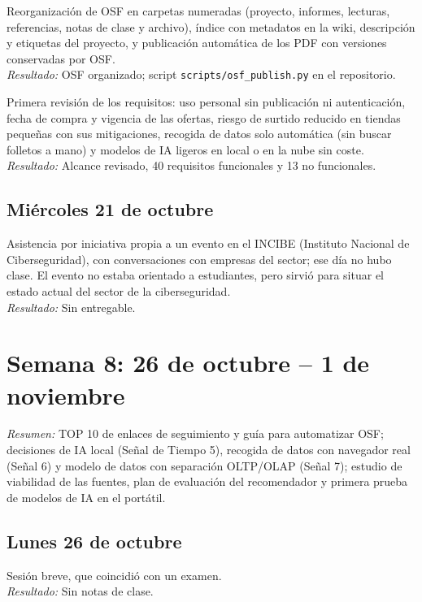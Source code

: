 \documentclass[11pt,a4paper]{article}
\newcommand{\actividad}[3]{\item[\textbf{[#1]}] #2 \\ \textit{Resultado:} #3}
\begin{document}
\begin{description}[leftmargin=0pt, itemsep=6pt]
		\actividad{Tarea}{Reorganización de OSF en carpetas numeradas (proyecto, informes, lecturas, referencias, notas de clase y archivo), índice con metadatos en la wiki, descripción y etiquetas del proyecto, y publicación automática de los PDF con versiones conservadas por OSF.}{OSF organizado; script \texttt{scripts/osf\_publish.py} en el repositorio.}
		\actividad{Análisis}{Primera revisión de los requisitos: uso personal sin publicación ni autenticación, fecha de compra y vigencia de las ofertas, riesgo de surtido reducido en tiendas pequeñas con sus mitigaciones, recogida de datos solo automática (sin buscar folletos a mano) y modelos de IA ligeros en local o en la nube sin coste.}{Alcance revisado, 40 requisitos funcionales y 13 no funcionales.}
	\end{description}

	\subsection*{Miércoles 21 de octubre}
	\begin{description}[leftmargin=0pt, itemsep=6pt]
		\actividad{Visita}{Asistencia por iniciativa propia a un evento en el INCIBE (Instituto Nacional de Ciberseguridad), con conversaciones con empresas del sector; ese día no hubo clase. El evento no estaba orientado a estudiantes, pero sirvió para situar el estado actual del sector de la ciberseguridad.}{Sin entregable.}
	\end{description}

	\section*{Semana 8: 26 de octubre -- 1 de noviembre}
	\textit{Resumen:} TOP 10 de enlaces de seguimiento y guía para automatizar OSF; decisiones de IA local (Señal de Tiempo 5), recogida de datos con navegador real (Señal 6) y modelo de datos con separación OLTP/OLAP (Señal 7); estudio de viabilidad de las fuentes, plan de evaluación del recomendador y primera prueba de modelos de IA en el portátil.

	\subsection*{Lunes 26 de octubre}
	\begin{description}[leftmargin=0pt, itemsep=6pt]
		\actividad{Clase}{Sesión breve, que coincidió con un examen.}{Sin notas de clase.}
	\end{description}
\end{document}
